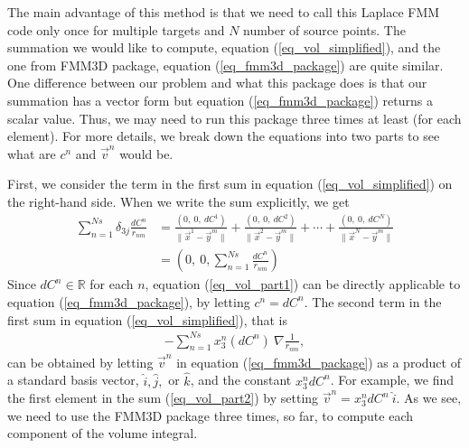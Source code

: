 The main advantage of this method is that we need to call this Laplace FMM code only once for multiple targets and $N$ number of source points. The summation we would like to compute, equation (\ref{eq_vol_simplified}), and the one from FMM3D package, equation (\ref{eq_fmm3d_package}) are quite similar. One difference between our problem and what this package does is that our summation has a vector form but equation (\ref{eq_fmm3d_package}) returns a scalar value. Thus, we may need to run this package three times at least (for each element). For more details, we break down the equations into two parts to see what are $c^n$ and $\vec{v}^n$ would be.
\par
First, we consider the term in the first sum in equation (\ref{eq_vol_simplified}) on the right-hand side. When we write the sum explicitly, we get
\begin{align}
	\sum_{n=1}^{Ns}
	\delta_{3j} \frac{d C^n}{ r_{nm}} 
	 & =  \frac{(0,\ 0, \ dC^1)}{ \|\vec{x}^1 - \vec{y}^m \|} 
	 +  \frac{(0,\ 0, \ d C^2)}{ \|\vec{x}^2 - \vec{y}^m \|} 
	 +  \cdots
	 +  \frac{(0,\ 0, \ dC^N)}{ \|\vec{x}^N - \vec{y}^m \|}
	 \nonumber \\
	 & = \left(0,\ 0, \sum_{n=1}^{Ns} \frac{dC^n}{ r_{nm}} \right)
\label{eq_vol_part1}
\end{align}
Since $dC^n \in \mathbb{R}$ for each $n$,
 equation (\ref{eq_vol_part1}) can be directly applicable to equation (\ref{eq_fmm3d_package}), by letting $c^n = d C^n$.
The second term in the first sum in equation (\ref{eq_vol_simplified}), that is
\begin{align}
		-\sum_{n=1}^{Ns} 
			x_3^n \left(d{C}^n \right)
			      \
			\nabla
				\frac{1}{r_{nm}},
\label{eq_vol_part2}
\end{align}
can be obtained by letting $\vec{v}^n$ in equation (\ref{eq_fmm3d_package}) as a product of a standard basis vector, $\hat{i}, \hat{j}, $ or $\hat{k}$, and the constant $x_3^n d  C^n$. For example, we find the first element in the sum (\ref{eq_vol_part2}) by setting $\vec{v}^n = x_3^n dC^n \ \hat{i}$. As we see, we need to use the FMM3D package three times, so far, to compute each component of the volume integral. 
